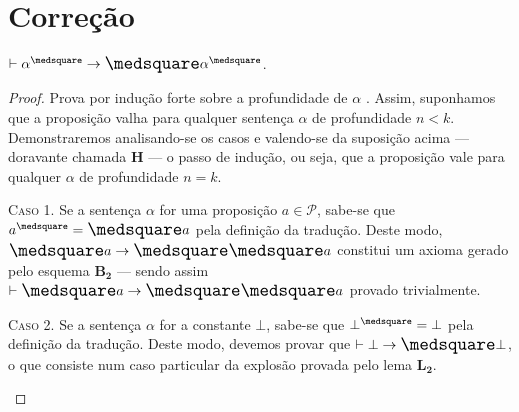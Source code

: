 \section{Correção}

    \begin{lemma}\label{square-nec}
        $\entails\alpha^\medsquare\to\nec\alpha^\medsquare$.

        \begin{proof}
            Prova por indução forte sobre a profundidade de $\alpha$ \citep{Troelstra}.
            Assim, suponhamos que a proposição valha para qualquer sentença $\alpha$ de profundidade $n<k$.
            Demonstraremos analisando-se os casos e valendo-se da suposição acima --- doravante chamada $\mathbf{H}$ --- o passo de indução, ou seja, que a proposição vale para qualquer $\alpha$ de profundidade $n=k$.

            \begin{case}
                \textsc{Caso 1.}
                Se a sentença $\alpha$ for uma proposição $a\in\mathcal{P}$, sabe-se que $a^\medsquare=\nec a$ pela definição da tradução.
                Deste modo, $\nec{a}\to\nec\nec{a}$ constitui um axioma gerado pelo esquema \hyperref[MB2]{$\mathbf{B_2}$} --- sendo assim $\entails\nec{a}\to\nec\nec{a}$ provado trivialmente.
            \end{case}

            \begin{case}
                \textsc{Caso 2.}
                Se a sentença $\alpha$ for a constante $\bot$, sabe-se que $\bot^\medsquare=\bot$ pela definição da tradução.
                Deste modo, devemos provar que $\entails\bot\to\nec\bot$, o que consiste num caso particular da explosão provada pelo lema \hyperref[explosion]{$\mathbf{L_2}$}.
            \end{case}


\end{proof}
\end{lemma}
